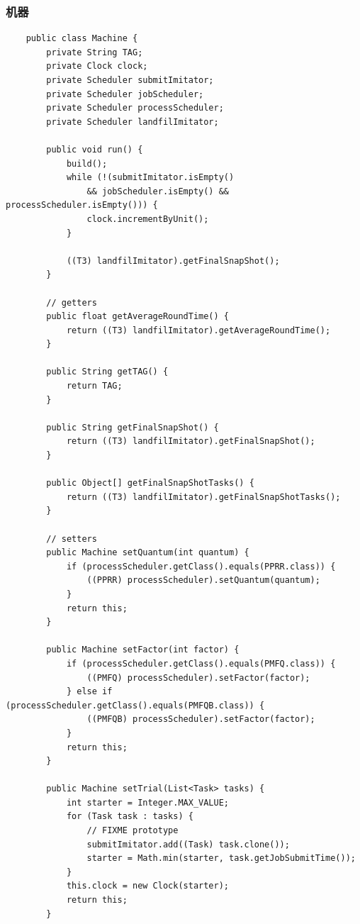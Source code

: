 \documentclass[12pt, a4paper, UTF8]{ctexart}
\begin{document}
\subsubsection{机器}
\begin{verbatim}
    public class Machine {
        private String TAG;
        private Clock clock;
        private Scheduler submitImitator;
        private Scheduler jobScheduler;
        private Scheduler processScheduler;
        private Scheduler landfilImitator;

        public void run() {
            build();
            while (!(submitImitator.isEmpty() 
                && jobScheduler.isEmpty() && processScheduler.isEmpty())) {
                clock.incrementByUnit();
            }

            ((T3) landfilImitator).getFinalSnapShot();
        }

        // getters
        public float getAverageRoundTime() {
            return ((T3) landfilImitator).getAverageRoundTime();
        }

        public String getTAG() {
            return TAG;
        }

        public String getFinalSnapShot() {
            return ((T3) landfilImitator).getFinalSnapShot();
        }

        public Object[] getFinalSnapShotTasks() {
            return ((T3) landfilImitator).getFinalSnapShotTasks();
        }

        // setters
        public Machine setQuantum(int quantum) {
            if (processScheduler.getClass().equals(PPRR.class)) {
                ((PPRR) processScheduler).setQuantum(quantum);
            }
            return this;
        }

        public Machine setFactor(int factor) {
            if (processScheduler.getClass().equals(PMFQ.class)) {
                ((PMFQ) processScheduler).setFactor(factor);
            } else if (processScheduler.getClass().equals(PMFQB.class)) {
                ((PMFQB) processScheduler).setFactor(factor);
            }
            return this;
        }

        public Machine setTrial(List<Task> tasks) {
            int starter = Integer.MAX_VALUE;
            for (Task task : tasks) {
                // FIXME prototype
                submitImitator.add((Task) task.clone());
                starter = Math.min(starter, task.getJobSubmitTime());
            }
            this.clock = new Clock(starter);
            return this;
        }


\end{verbatim}
\end{document}
